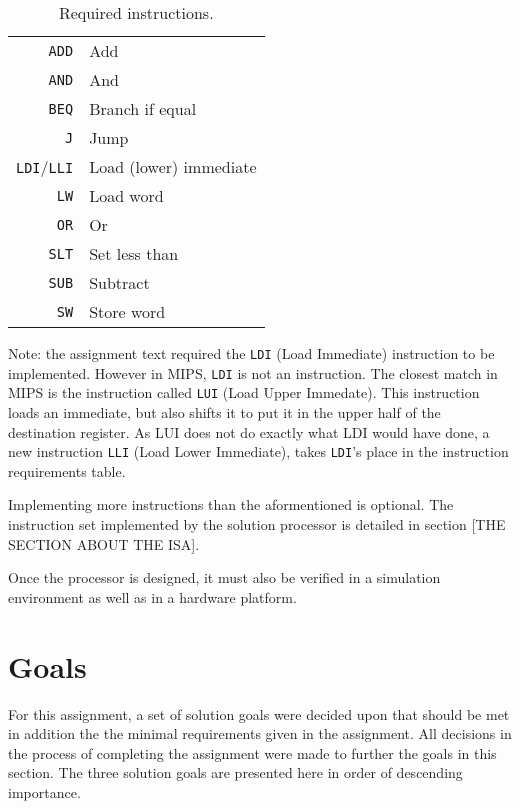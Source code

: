\begin{table}
    \begin{center}
        \begin{tabular}{r|l}
            \texttt{ADD} & Add \\
            \texttt{AND} & And \\
            \texttt{BEQ} & Branch if equal \\
            \texttt{J} & Jump \\
            \texttt{LDI}/\texttt{LLI} & Load (lower) immediate \\
            \texttt{LW} & Load word \\
            \texttt{OR} & Or \\
            \texttt{SLT} & Set less than \\
            \texttt{SUB} & Subtract \\
            \texttt{SW} & Store word \\
            \hline
        \end{tabular}
        \smallskip
        \smallskip
        \caption{Required instructions.}
        \label{table:required-instructions}
    \end{center}
\end{table}

Note: the assignment text required the \texttt{LDI} (Load Immediate) instruction to be implemented.
However in MIPS, \texttt{LDI} is not an instruction.
The closest match in MIPS is the instruction called \texttt{LUI} (Load Upper Immedate).
This instruction loads an immediate, but also shifts it to put it in the upper half of the destination register.
As LUI does not do exactly what LDI would have done, a new instruction \texttt{LLI} (Load Lower Immediate), takes \texttt{LDI}'s place in the instruction requirements table.

Implementing more instructions than the aformentioned is optional.
The instruction set implemented by the solution processor is detailed in section [THE SECTION ABOUT THE ISA].

Once the processor is designed, it must also be verified in a simulation environment as well as in a hardware platform.

\section{Goals}

For this assignment, a set of solution goals were decided upon that should be met in addition the the minimal requirements given in the assignment.
All decisions in the process of completing the assignment were made to further the goals in this section.
The three solution goals are presented here in order of descending importance.

